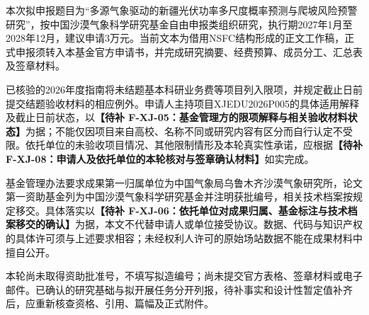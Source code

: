 \justifying
\NSFCBodyText

本次拟申报题目为“多源气象驱动的新疆光伏功率多尺度概率预测与爬坡风险预警研究”，按中国沙漠气象科学研究基金自由申报类组织研究，执行期2027年1月至2028年12月，建议申请3万元。当前文本为借用NSFC结构形成的正文工作稿，正式申报须转入本基金官方申请书，并完成研究摘要、经费预算、成员分工、汇总表及签章材料。

已核验的2026年度指南将未结题基本科研业务费等项目列入限项，并规定截止日前提交结题验收材料的相应例外。申请人主持项目XJEDU2026P005的具体适用解释及截止日前状态，以\textbf{【待补 F-XJ-05：基金管理方的限项解释与相关验收材料状态】}为据；不能仅因项目来自高校、名称不同或研究内容有区分而自行认定不受限。依托单位的未验收项目情况、其他限制情形及本轮真实性承诺，应根据\textbf{【待补 F-XJ-08：申请人及依托单位的本轮核对与签章确认材料】}如实完成。

基金管理办法要求成果第一归属单位为中国气象局乌鲁木齐沙漠气象研究所，论文第一资助基金列为中国沙漠气象科学研究基金并注明获批编号，相关技术档案按规定移交。具体落实以\textbf{【待补 F-XJ-06：依托单位对成果归属、基金标注与技术档案移交的确认】}为据，本文不代替申请人或单位接受协议。数据、代码与知识产权的具体许可须与上述要求相容；未经权利人许可的原始场站数据不能在成果材料中擅自公开。

本轮尚未取得资助批准号，不填写拟造编号；尚未提交官方表格、签章材料或电子邮件。已确认的研究基础与拟开展任务分开列报，待补事实和设计性暂定值补齐后，应重新核查资格、引用、篇幅及正式附件。
